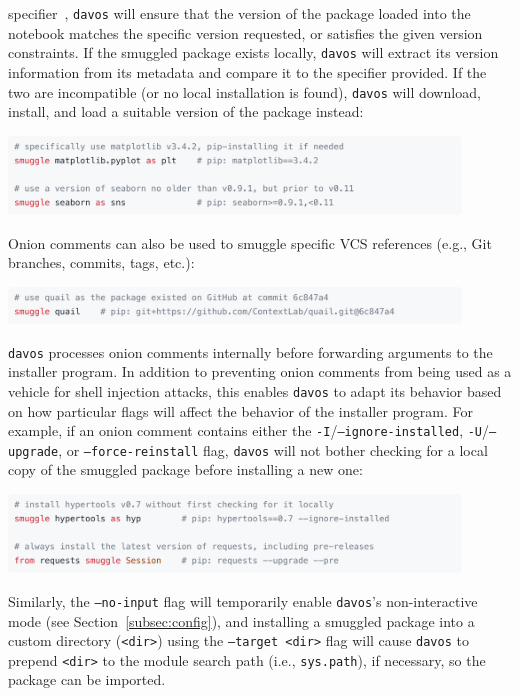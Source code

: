 \documentclass[preprint,12pt,a4paper]{elsarticle}
\begin{document}
specifier~\cite{CoghStuf13}, \texttt{davos} will ensure that the
version of the package loaded into the notebook matches the specific
version requested, or satisfies the given version constraints. If the
smuggled package exists locally, \texttt{davos} will extract its
version information from its metadata and compare it to the specifier
provided. If the two are incompatible (or no local installation is
found), \texttt{davos} will download, install, and load a suitable
version of the package instead:
\begin{center}
\includegraphics[width=0.9\textwidth]{figs/snippet3}
\end{center}
Onion comments can also be used to smuggle specific VCS references
(e.g., Git~\cite{TorvHama05} branches, commits, tags, etc.):
\begin{center}
\includegraphics[width=0.9\textwidth]{figs/snippet4}
\end{center}
\texttt{davos} processes onion comments internally before forwarding
arguments to the installer program. In addition to preventing onion
comments from being used as a vehicle for shell injection attacks,
this enables \texttt{davos} to adapt its behavior based on how particular
flags will affect the behavior of the installer program. For example, if an
onion comment contains either the \texttt{-I}/\texttt{--ignore-installed},
\texttt{-U}/\texttt{--upgrade}, or \texttt{--force-reinstall} flag,
\texttt{davos} will not bother checking for a local copy of the smuggled
package before installing a new one:
\begin{center}
\includegraphics[width=0.9\textwidth]{figs/snippet5}
\end{center}
Similarly, the \texttt{--no-input} flag will temporarily enable
\texttt{davos}'s non-interactive mode (see
Section~\ref{subsec:config}), and installing a smuggled package into a
custom directory (\texttt{<dir>}) using the \texttt{--target <dir>}
flag will cause \texttt{davos} to prepend \texttt{<dir>} to the module
search path (i.e., \texttt{sys.path}), if necessary, so the package
can be imported.
\end{document}
